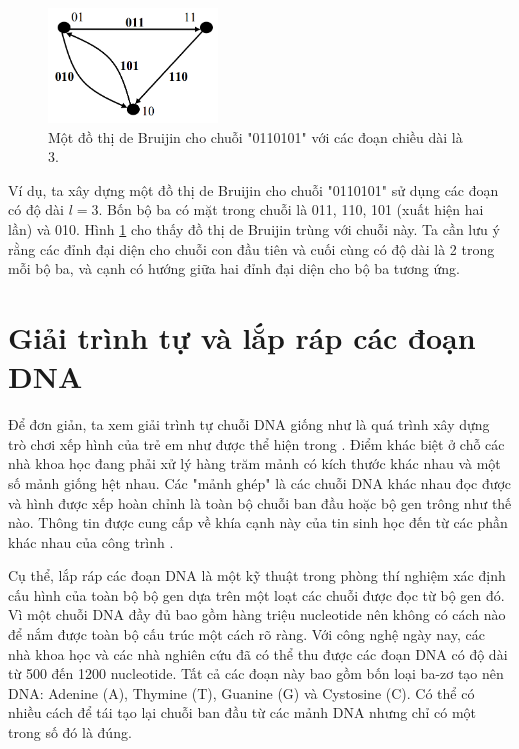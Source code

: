 \documentclass[14pt, a4paper]{article}
\numberwithin{equation}{section}
\numberwithin{figure}{section}
\numberwithin{dl}{section}
\numberwithin{md}{section}
\numberwithin{bd}{section}
\numberwithin{dn}{section}
\numberwithin{hq}{section}
\begin{document}
    \begin{figure}[h!]
        \centering
        \includegraphics[width=0.4\textwidth]{1.png}
        \caption{Một đồ thị de Bruijin cho chuỗi "0110101" với các đoạn chiều dài là 3.}
        \label{fig:1}
    \end{figure}

    Ví dụ, ta xây dựng một đồ thị de Bruijin cho chuỗi "0110101" sử dụng các đoạn có độ dài $l=3$.
    Bốn bộ ba có mặt trong chuỗi là 011, 110, 101 (xuất hiện hai lần) và 010.
    Hình \ref{fig:1} cho thấy đồ thị de Bruijin trùng với chuỗi này.
    Ta cần lưu ý rằng các đỉnh đại diện cho chuỗi con đầu tiên và cuối cùng có độ dài là 2 trong mỗi bộ ba, và cạnh có hướng giữa hai đỉnh đại diện cho bộ ba tương ứng.

    \section{Giải trình tự và lắp ráp các đoạn DNA}

    Để đơn giản, ta xem giải trình tự chuỗi DNA giống như là quá trình xây dựng trò chơi xếp hình của trẻ em như được thể hiện trong \cite{pevzner2001eulerian}.
    Điểm khác biệt ở chỗ các nhà khoa học đang phải xử lý hàng trăm mảnh có kích thước khác nhau và một số mảnh giống hệt nhau.
    Các "mảnh ghép" là các chuỗi DNA khác nhau đọc được và hình được xếp hoàn chỉnh là toàn bộ chuỗi ban đầu hoặc bộ gen trông như thế nào.
    Thông tin được cung cấp về khía cạnh này của tin sinh học đến từ các phần khác nhau của công trình \cite{jones2004introduction}.

    Cụ thể, lắp ráp các đoạn DNA là một kỹ thuật trong phòng thí nghiệm xác định cấu hình của toàn bộ bộ gen dựa trên một loạt các chuỗi được đọc từ bộ gen đó.
    Vì một chuỗi DNA đầy đủ bao gồm hàng triệu nucleotide nên không có cách nào để nắm được toàn bộ cấu trúc một cách rõ ràng.
    Với công nghệ ngày nay, các nhà khoa học và các nhà nghiên cứu đã có thể thu được các đoạn DNA có độ dài từ 500 đến 1200 nucleotide.
    Tất cả các đoạn này bao gồm bốn loại ba-zơ tạo nên DNA: Adenine (A), Thymine (T), Guanine (G) và Cystosine (C).
    Có thể có nhiều cách để tái tạo lại chuỗi ban đầu từ các mảnh DNA nhưng chỉ có một trong số đó là đúng.
\end{document}
